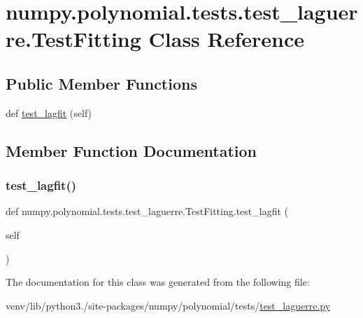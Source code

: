 \hypertarget{classnumpy_1_1polynomial_1_1tests_1_1test__laguerre_1_1TestFitting}{}\section{numpy.\+polynomial.\+tests.\+test\+\_\+laguerre.\+Test\+Fitting Class Reference}
\label{classnumpy_1_1polynomial_1_1tests_1_1test__laguerre_1_1TestFitting}
\subsection*{Public Member Functions}
\begin{DoxyCompactItemize}
\item 
def \hyperlink{classnumpy_1_1polynomial_1_1tests_1_1test__laguerre_1_1TestFitting_a16a2b224df6b3b901fe0d9a187652c09}{test\+\_\+lagfit} (self)
\end{DoxyCompactItemize}


\subsection{Member Function Documentation}
\mbox{\label{classnumpy_1_1polynomial_1_1tests_1_1test__laguerre_1_1TestFitting_a16a2b224df6b3b901fe0d9a187652c09}} 
\subsubsection{\texorpdfstring{test\+\_\+lagfit()}{test\_lagfit()}}
{\footnotesize\ttfamily def numpy.\+polynomial.\+tests.\+test\+\_\+laguerre.\+Test\+Fitting.\+test\+\_\+lagfit (\begin{DoxyParamCaption}\item[{}]{self }\end{DoxyParamCaption})}



The documentation for this class was generated from the following file\+:\begin{DoxyCompactItemize}
\item 
venv/lib/python3./site-\/packages/numpy/polynomial/tests/\hyperlink{test__laguerre_8py}{test\+\_\+laguerre.\+py}\end{DoxyCompactItemize}
